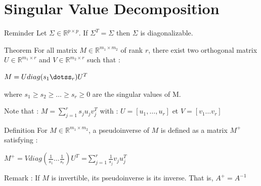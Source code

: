 \documentclass[unknownkeysallowed]{beamer}
\begin{document}
\section{Singular Value Decomposition}
\label{sec:conclusion}

\begin{frame}
\begin{block}{Reminder}
Let $\Sigma\in\mathbb{R}^{p \times p}$.
\newline
If   $\Sigma^T=\Sigma$ then $\Sigma$ is diagonalizable.
\end{block}
\begin{alertblock}{Theorem}
For all matrix $M\in\mathbb{R}^{m_1 \times m_2}$ of rank $r$, there exist two orthogonal matrix $U\in \mathbb{R}^{m_1 \times r}$ and $V\in\mathbb{R}^{m_2 \times r}$ such that :
\begin{center}
    $M=U diag(s_{1}\dotss_{r})U^T$
\end{center}
where $s_{1}\ge s_{2} \ge \dots \ge s_{r} \ge 0$ are the singular values of M.
\end{alertblock}
\vspace{0.5cm}
Note that : $M=\sum\limits_{j=1}^r s_{j}u_{j}v_{j}^T$ with : $U=[u_{1},\dots,u_{r}]$
et $V=[v_{1} \dots v_{r}]$
\end{frame}

\begin{frame}
\begin{block}{Definition}
For $M\in\mathbb{R}^{m_1 \times m_2}$, a pseudoinverse of $M$ is defined as a matrix $M^{+}$ satisfying :
\begin{center}
    $M^{+}=Vdiag(\frac{1}{s_{1}} \dots \frac{1}{s_{r}})U^T$
    =$\sum\limits_{j=1}^r \frac{1}{s_{j}}v_{j}u_{j}^T$
\end{center}
\end{block}
\vspace{0.5cm}
Remark : If $M$ is invertible, its pseudoinverse is its inverse. That is, $A^{+}=A^{-1}$
\end{frame}
\end{document}
